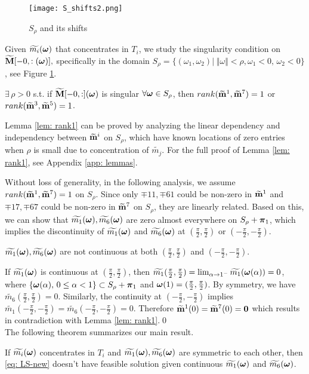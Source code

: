 \begin{figure}
\centering
\texttt{[image: S\_shifts2.png]}
\caption{$S_{\rho}$ and its shifts}
\label{fig: S-shifts}
\end{figure}
Given $\widetilde{m_{i}}(\boldsymbol{\omega})$ that concentrates in $T_i$, we study the singularity condition on $\widetilde{\mathbf{M}}[-0,:(\boldsymbol{\omega})],$ specifically in the domain $S_{\rho} = \{(\omega_1,\omega_2)|\;\Vert\omega\Vert < \rho, \omega_1 <0,\,\omega_2<0\}$, see Figure \ref{fig: S-shifts}. 

\begin{lemma}\label{lem: rank1}
$\exists\, \rho>0$ s.t.  if $\widetilde{\mathbf{M}}[-0,:](\boldsymbol{\omega})$ is singular $\forall \boldsymbol{\omega}\in S_\rho$, then $rank(\widetilde{\mathbf{m}}^{1},\widetilde{\mathbf{m}}^{7})=1$ or $rank(\widetilde{\mathbf{m}}^{3},\widetilde{\mathbf{m}}^{5}) = 1$.
\end{lemma}
Lemma \ref{lem: rank1} can be proved by analyzing the linear dependency and independency between $\widetilde{\mathbf{m}}^{i}$ on $S_\rho$, which have known locations of zero entries when $\rho$ is small due to concentration of $\widetilde{m_j}$.
For the full proof of Lemma \ref{lem: rank1}, see Appendix \ref{app: lemmas}.

Without loss of generality, in the following analysis, we assume $rank(\widetilde{\mathbf{m}}^{1},\widetilde{\mathbf{m}}^{7}) = 1$ on $S_\rho$.
Since only $\mp{1}{1}, \mp{6}{1}$ could be non-zero in $\widetilde{\mathbf{m}}^{1}$ and $\mp{1}{7}, \mp{6}{7}$ could be non-zero in $\widetilde{\mathbf{m}}^{7}$ on $S_\rho$, they are linearly related. Based on this, we can show that $\widetilde{m_{1}}(\boldsymbol{\omega}),\widetilde{m_{6}}(\boldsymbol{\omega})$ are zero almost everywhere on $S_\rho + \boldsymbol{\pi}_1$, which implies the discontinuity of $\widetilde{m_{1}}(\boldsymbol{\omega})$ and $\widetilde{m_{6}}(\boldsymbol{\omega})$ at $(\frac{\pi}{2},\frac{\pi}{2})$ or $(-\frac{\pi}{2},-\frac{\pi}{2})$.

\begin{proposition}\label{prop: continuity}
$\widetilde{m_{1}}(\boldsymbol{\omega}),\widetilde{m_{6}}(\boldsymbol{\omega})$ are not continuous at both $(\frac{\pi}{2},\frac{\pi}{2})$ and $(-\frac{\pi}{2},-\frac{\pi}{2})$.
\end{proposition}
If $\widetilde{m_{1}}(\boldsymbol{\omega})$ is continuous at $(\frac{\pi}{2},\frac{\pi}{2})$, then $\widetilde{m_1}(\frac{\pi}{2},\frac{\pi}{2}) = \lim_{\alpha\rightarrow 1^-}\widetilde{m_1}(\boldsymbol{\omega}(\alpha)) = 0$, where $\{\boldsymbol{\omega}(\alpha),\,0\leq \alpha<1\} \subset S_\rho + \boldsymbol{\pi}_1$ and $\boldsymbol{\omega}(1) = (\frac{\pi}{2},\frac{\pi}{2})$. By symmetry, we have $\widetilde{m_6}(\frac{\pi}{2},\frac{\pi}{2}) = 0$. Similarly, the continuity at $(-\frac{\pi}{2},-\frac{\pi}{2})$ implies $\widetilde{m_1}(-\frac{\pi}{2},-\frac{\pi}{2}) = \widetilde{m_6}(-\frac{\pi}{2},-\frac{\pi}{2}) = 0$. Therefore $\widetilde{\mathbf{m}}^{1}(0) = \widetilde{\mathbf{m}}^{7}(0) = \mathbf{0}$ which results in contradiction with Lemma \ref{lem: rank1}.\qed\\[1em]%
The following theorem summarizes our main result.
\begin{theorem}\label{thm: thm}
If  $\widetilde{m_{i}}(\boldsymbol{\omega})$ concentrates in $T_i$ and $\widetilde{m_{1}}(\boldsymbol{\omega}),\widetilde{m_{6}}(\boldsymbol{\omega})$ are symmetric to each other,  then  \eqref{eq: LS-new} doesn't have feasible solution given continuous $\widetilde{m_{1}}(\boldsymbol{\omega})$ and $\widetilde{m_{6}}(\boldsymbol{\omega})$.
\end{theorem}

